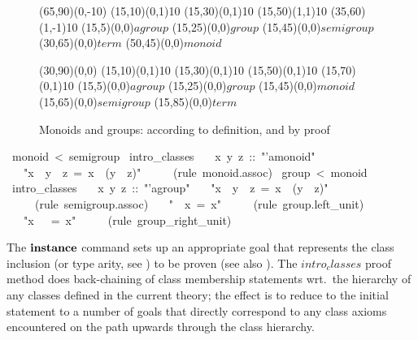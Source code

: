 \begin{isabelle}
\begin{isamarkuptext}
 \begin{figure}[htbp]
   \begin{center}
     \small
     \unitlength 0.6mm
     \begin{picture}(65,90)(0,-10)
       \put(15,10){\line(0,1){10}} \put(15,30){\line(0,1){10}}
       \put(15,50){\line(1,1){10}} \put(35,60){\line(1,-1){10}}
       \put(15,5){\makebox(0,0){$agroup$}}
       \put(15,25){\makebox(0,0){$group$}}
       \put(15,45){\makebox(0,0){$semigroup$}}
       \put(30,65){\makebox(0,0){$term$}} \put(50,45){\makebox(0,0){$monoid$}}
     \end{picture}
     \hspace{4em}
     \begin{picture}(30,90)(0,0)
       \put(15,10){\line(0,1){10}} \put(15,30){\line(0,1){10}}
       \put(15,50){\line(0,1){10}} \put(15,70){\line(0,1){10}}
       \put(15,5){\makebox(0,0){$agroup$}}
       \put(15,25){\makebox(0,0){$group$}}
       \put(15,45){\makebox(0,0){$monoid$}}
       \put(15,65){\makebox(0,0){$semigroup$}}
       \put(15,85){\makebox(0,0){$term$}}
     \end{picture}
     \caption{Monoids and groups: according to definition, and by proof}
     \label{fig:monoid-group}
   \end{center}
 \end{figure}%
\end{isamarkuptext}%
~monoid~<~semigroup\isanewline
{}~intro\_classes\isanewline
~~~x~y~z~::~{"}'a{\isasymColon}monoid{"}\isanewline
~~~{"}x~{\isasymOtimes}~y~{\isasymOtimes}~z~=~x~{\isasymOtimes}~(y~{\isasymOtimes}~z){"}\isanewline
~~~~~(rule~monoid.assoc)\isanewline
{}\isanewline
\isanewline
{}~group~<~monoid\isanewline
{}~intro\_classes\isanewline
~~~x~y~z~::~{"}'a{\isasymColon}group{"}\isanewline
~~~{"}x~{\isasymOtimes}~y~{\isasymOtimes}~z~=~x~{\isasymOtimes}~(y~{\isasymOtimes}~z){"}\isanewline
~~~~~(rule~semigroup.assoc)\isanewline
~~~{"}{\isasymunit}~{\isasymOtimes}~x~=~x{"}\isanewline
~~~~~(rule~group.left\_unit)\isanewline
~~~{"}x~{\isasymOtimes}~{\isasymunit}~=~x{"}\isanewline
~~~~~(rule~group\_right\_unit)\isanewline
{}%
\begin{isamarkuptext}%
\medskip The $\emph{\bf instance}$ command sets up an appropriate
 goal that represents the class inclusion (or type arity, see
 ) to be proven
 (see also \cite{isabelle-isar-ref}).  The $intro_classes$ proof
 method does back-chaining of class membership statements wrt.\ the
 hierarchy of any classes defined in the current theory; the effect is
 to reduce to the initial statement to a number of goals that directly
 correspond to any class axioms encountered on the path upwards
 through the class hierarchy.


\end{isamarkuptext}
\end{isabelle}
